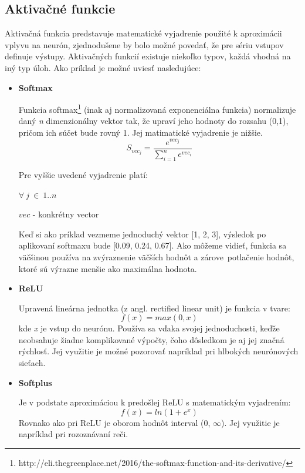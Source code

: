 \subsection{Aktivačné funkcie}\label{activation_functions}

Aktivačná funkcia predstavuje matematické vyjadrenie použité k aproximácii vplyvu na neurón, zjednodušene by bolo možné povedať, že pre sériu vstupov definuje výstupy. Aktivačných funkcií existuje niekoľko typov, každá vhodná na iný typ úloh. Ako príklad je možné uviesť nasledujúce: 
	\begin{itemize}
		\item {\textbf{Softmax}}
		
		Funkcia softmax\footnote{http://eli.thegreenplace.net/2016/the-softmax-function-and-its-derivative/} (inak aj normalizovaná exponenciálna funkcia) normalizuje daný  \textit{n} dimenzionálny vektor tak, že upraví jeho hodnoty do rozsahu (0,1), pričom ich súčet bude rovný 1. Jej matimatické vyjadrenie je nižšie. 
		\begin{equation}
		S_{vec_j} = \frac{e^{vec_j}}{\sum_{i=1}^{n}e^{vec_i}}
		\end{equation}
		
		Pre vyššie uvedené vyjadrenie platí:
		
		\(\forall{\ j\ }\in\ 1..n\)
		
		\(vec \) - konkrétny vector
		
		Keď si ako príklad vezmeme jednoduchý vektor [1, 2, 3], výsledok po aplikovaní softmaxu bude [0.09, 0.24, 0.67]. Ako môžeme vidieť, funkcia sa väčšinou používa na zvýraznenie väčších hodnôt a zárove\ potlačenie hodnôt, ktoré sú výrazne menšie ako maximálna hodnota. 
		
		\item {\textbf{ReLU}}
		
		Upravená lineárna jednotka (z angl. rectified linear unit) je funkcia 
		v tvare:
		\begin{equation}
		f(x) = max (0, x)
		\end{equation}
		kde \textit{x} je vstup do neurónu. Používa sa vďaka svojej jednoduchosti, keďže neobsahuje žiadne komplikované výpočty, čoho dôsledkom je aj jej značná rýchlosť. Jej využitie je možné pozorovať napríklad pri hlbokých neurónových sieťach.
		
		\item{\textbf{Softplus}}
		
		Je v podstate aproximáciou k predošlej ReLU s matematickým vyjadrením:
		\begin{equation}
		f(x)=ln (1 + e^x)
		\end{equation}
		Rovnako ako pri ReLU je oborom hodnôt interval (0, \(\infty\)). Jej využitie je napríklad pri rozoznávaní reči.
		

\end{itemize}
